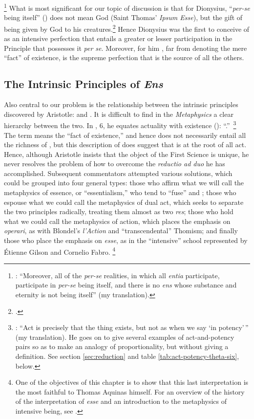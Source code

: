 %
\footnote{\Cite[V, 5]{pg:dionysius:DN}: ``Moreover, all of the \emph{per-se} realities, in which all \emph{entia} participate, participate in \emph{per-se} being itself, and there is no \emph{ens} whose substance and eternity is not being itself'' (my translation).} What is most significant for our topic of discussion is that for Dionysius, ``\emph{per-se} being itself'' () does not mean God (Saint Thomas' \emph{Ipsum Esse}), but the gift of being given by God to his creatures.\footcite[54]{orourke:pseudo-dionysius} Hence Dionysius was the first to conceive of  as an intensive perfection that entails a greater or lesser participation in the Principle that possesses it \emph{per se}. Moreover, for him , far from denoting the mere ``fact'' of existence, is the supreme perfection that is the source of all the others. 

\subsection{The Intrinsic Principles of \emph{Ens}}

Also central to our problem is the relationship between the intrinsic principles discovered by Aristotle:  and . It is difficult to find in the \emph{Metaphysics} a clear hierarchy between the two. In , 6, he equates actuality with existence (): ``.''\,%
%
\footnote{\Cite[, 6, 1048a31-32]{aristotle:metaphysics}: ``Act is precisely that the thing exists, but not as when we say `in potency'\,'' (my translation). He goes on to give several examples of act-and-potency pairs so as to make an analogy of proportionality, but without giving a definition. See section \ref{sec:reduction} and table \ref{tab:act-potency-theta-six}, below.}
%
The term  means the ``fact of existence,'' and hence does not necessarily entail all the richness of , but this description of  does suggest that  is at the root of all act. Hence, although Aristotle insists that the object of the First Science is unique, he never resolves the problem of how to overcome the \emph{reductio ad duo} he has accomplished. Subsequent commentators attempted various solutions, which could be grouped into four general types: those who affirm what we will call the metaphysics of essence, or ``essentialism,'' who tend to ``fuse''  and ; those who espouse what we could call the metaphysics of dual act, which seeks to separate the two principles radically, treating them almost as two \emph{res}; those who hold what we could call the metaphysics of action, which places the emphasis on \emph{operari}, as with Blondel's \emph{l'Action} and ``transcendental'' Thomism; and finally those who place the emphasis on \emph{esse}, as in the ``intensive'' school represented by Étienne Gilson and Cornelio Fabro.%
%
\footnote{One of the objectives of this chapter is to show that this last interpretation is the most faithful to Thomas Aquinas himself. For an overview of the history of the interpretation of \emph{esse} and an introduction to the metaphysics of intensive being, see \cite{fabro:intensive}.}

